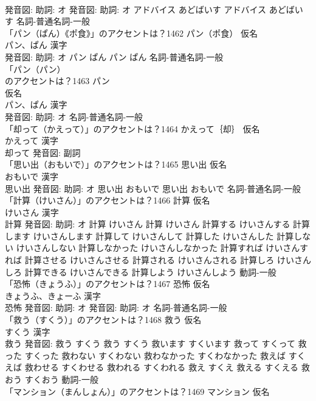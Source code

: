 \documentclass[8pt]{extreport}
\begin{document}
\begin{CJK}{UTF8}{min}
\\	発音図: 助詞: オ 発音図: 助詞: オ	アドバイス あどばいす		アドバイス あどばいす				名詞-普通名詞-一般 
\\	「パン（ぱん）《ポ食》」のアクセントは？1462	パン（ポ食） 仮名　
\\	パン、ぱん 漢字　
\\	発音図: 助詞: オ	パン ぱん		パン ぱん				名詞-普通名詞-一般 
\\	「パン（パン）
\\	のアクセントは？1463	パン
\\	仮名　
\\	パン、ぱん 漢字　
\\	発音図: 助詞: オ							名詞-普通名詞-一般 
\\	「却って（かえって）」のアクセントは？1464	かえって｛却｝ 仮名　
\\	かえって 漢字　
\\	却って 発音図:							副詞 
\\	「思い出（おもいで）」のアクセントは？1465	思い出 仮名　
\\	おもいで 漢字　
\\	思い出 発音図: 助詞: オ	思い出 おもいで		思い出 おもいで				名詞-普通名詞-一般 
\\	「計算（けいさん）」のアクセントは？1466	計算 仮名　
\\	けいさん 漢字　
\\	計算 発音図: 助詞: オ	計算 けいさん		計算 けいさん 計算する けいさんする 計算します けいさんします 計算して けいさんして 計算した けいさんした 計算しない けいさんしない 計算しなかった けいさんしなかった 計算すれば けいさんすれば 計算させる けいさんさせる 計算される けいさんされる 計算しろ けいさんしろ 計算できる けいさんできる 計算しよう けいさんしよう				動詞-一般 
\\	「恐怖（きょうふ）」のアクセントは？1467	恐怖 仮名　
\\	きょうふ、きょーふ 漢字　
\\	恐怖 発音図: 助詞: オ 発音図: 助詞: オ							名詞-普通名詞-一般 
\\	「救う（すくう）」のアクセントは？1468	救う 仮名　
\\	すくう 漢字　
\\	救う 発音図:	救う すくう		救う すくう 救います すくいます 救って すくって 救った すくった 救わない すくわない 救わなかった すくわなかった 救えば すくえば 救わせる すくわせる 救われる すくわれる 救え すくえ 救える すくえる 救おう すくおう				動詞-一般 
\\	「マンション（まんしょん）」のアクセントは？1469	マンション 仮名　

\end{CJK}
\end{document}
